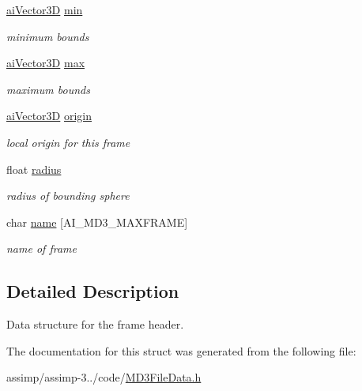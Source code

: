 \begin{DoxyCompactItemize}
\item 
\hypertarget{struct_assimp_1_1_m_d3_1_1_frame_a9054b696482f45f3274efb6b992b4349}{\hyperlink{structai_vector3_d}{ai\+Vector3\+D} \hyperlink{struct_assimp_1_1_m_d3_1_1_frame_a9054b696482f45f3274efb6b992b4349}{min}}\label{struct_assimp_1_1_m_d3_1_1_frame_a9054b696482f45f3274efb6b992b4349}

\begin{DoxyCompactList}\small\item\em minimum bounds \end{DoxyCompactList}\item 
\hypertarget{struct_assimp_1_1_m_d3_1_1_frame_a84bf6a617dcaa91b0943419bd45d6ab2}{\hyperlink{structai_vector3_d}{ai\+Vector3\+D} \hyperlink{struct_assimp_1_1_m_d3_1_1_frame_a84bf6a617dcaa91b0943419bd45d6ab2}{max}}\label{struct_assimp_1_1_m_d3_1_1_frame_a84bf6a617dcaa91b0943419bd45d6ab2}

\begin{DoxyCompactList}\small\item\em maximum bounds \end{DoxyCompactList}\item 
\hypertarget{struct_assimp_1_1_m_d3_1_1_frame_a0a9ed73c0a7ff82c91d467c29501f4da}{\hyperlink{structai_vector3_d}{ai\+Vector3\+D} \hyperlink{struct_assimp_1_1_m_d3_1_1_frame_a0a9ed73c0a7ff82c91d467c29501f4da}{origin}}\label{struct_assimp_1_1_m_d3_1_1_frame_a0a9ed73c0a7ff82c91d467c29501f4da}

\begin{DoxyCompactList}\small\item\em local origin for this frame \end{DoxyCompactList}\item 
\hypertarget{struct_assimp_1_1_m_d3_1_1_frame_aadf4ada399004ab8f03bfd4a46c87788}{float \hyperlink{struct_assimp_1_1_m_d3_1_1_frame_aadf4ada399004ab8f03bfd4a46c87788}{radius}}\label{struct_assimp_1_1_m_d3_1_1_frame_aadf4ada399004ab8f03bfd4a46c87788}

\begin{DoxyCompactList}\small\item\em radius of bounding sphere \end{DoxyCompactList}\item 
\hypertarget{struct_assimp_1_1_m_d3_1_1_frame_a3674dd645a5b08b13ff82d11fa6946fd}{char \hyperlink{struct_assimp_1_1_m_d3_1_1_frame_a3674dd645a5b08b13ff82d11fa6946fd}{name} \mbox{[}A\+I\+\_\+\+M\+D3\+\_\+\+M\+A\+X\+F\+R\+A\+M\+E\mbox{]}}\label{struct_assimp_1_1_m_d3_1_1_frame_a3674dd645a5b08b13ff82d11fa6946fd}

\begin{DoxyCompactList}\small\item\em name of frame \end{DoxyCompactList}\end{DoxyCompactItemize}


\subsection{Detailed Description}
Data structure for the frame header. 

The documentation for this struct was generated from the following file\+:\begin{DoxyCompactItemize}
\item 
assimp/assimp-\/3../code/\hyperlink{_m_d3_file_data_8h}{M\+D3\+File\+Data.\+h}\end{DoxyCompactItemize}
